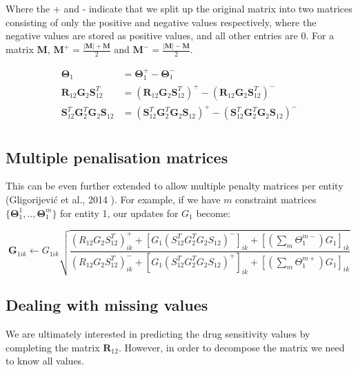 \documentclass{article}
\begin{document}
			\noindent Where the + and - indicate that we split up the original matrix into two matrices consisting of only the positive and negative values respectively, where the negative values are stored as positive values, and all other entries are 0. For a matrix \( \boldsymbol M \), \( \boldsymbol M^+ = \frac{|\boldsymbol M| + \boldsymbol M}{2} \) and \( \boldsymbol M^- = \frac{|\boldsymbol M| - \boldsymbol M}{2} \).
			
			\begin{equation*} 
			\begin{split}
				\boldsymbol \Theta_1 &= \boldsymbol \Theta_1^+ - \boldsymbol \Theta_1^- \\
				\boldsymbol R_{12} \boldsymbol G_2 \boldsymbol S_{12}^T &= (\boldsymbol R_{12} \boldsymbol G_2 \boldsymbol S_{12}^T)^+ - (\boldsymbol R_{12} \boldsymbol G_2 \boldsymbol S_{12}^T)^- \\
				\boldsymbol S_{12}^T \boldsymbol G_2^T \boldsymbol G_2 \boldsymbol S_{12} &= (\boldsymbol S_{12}^T \boldsymbol G_2^T \boldsymbol G_2 \boldsymbol S_{12})^+ - (\boldsymbol S_{12}^T \boldsymbol G_2^T \boldsymbol G_2 \boldsymbol S_{12})^- \\
			\end{split}			
			\end{equation*}
			
		
		\subsection{Multiple penalisation matrices}
			This can be even further extended to allow multiple penalty matrices per entity (Gligorijevi\'{c} et al., 2014 \cite{gligorijevic_2014}). For example, if we have \( m \) constraint matrices \( \{ \boldsymbol \Theta_1^1,..,\boldsymbol \Theta_1^m \} \) for entity 1, our updates for \( G_1 \) become: 
			
			\begin{equation*}
				\boldsymbol G_{1ik} \leftarrow G_{1ik} \sqrt
					{ \frac{ (R_{12} G_2 S_{12}^T)_{ik}^+ +  [G_1 (S_{12}^T G_2^T G_2 S_{12})^-]_{ik} + [(\sum_m \Theta_1^{m-}) G_1]_{ik} }
					{ (R_{12} G_2 S_{12}^T)_{ik}^- +  [G_1 (S_{12}^T G_2^T G_2 S_{12})^+]_{ik} + [(\sum_m \Theta_1^{m+}) G_1]_{ik} } }
			\end{equation*}			
			
			
		\subsection{Dealing with missing values} \label{Dealing with missing values}
			We are ultimately interested in predicting the drug sensitivity values by completing the matrix \( \boldsymbol R_{12} \). However, in order to decompose the matrix we need to know all values. 
			
\end{document}
